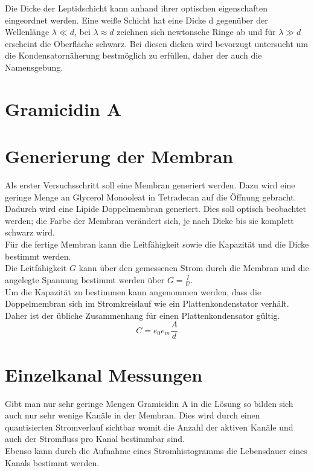 \documentclass{include/thesisclass3}
\begin{document}
Die Dicke der Leptidschicht kann anhand ihrer optischen eigenschaften eingeordnet werden. Eine weiße Schicht hat eine Dicke d gegenüber der Wellenlänge $\lambda \ll d$, bei $\lambda \approx d$ zeichnen sich newtonsche Ringe ab und für $\lambda \gg d$ erscheint die Oberfläche schwarz. Bei diesen dicken wird bevorzugt untersucht um die Kondensatornäherung bestmöglich zu erfüllen, daher der auch die Namensgebung.

\section{Gramicidin A}



\section{Generierung der Membran}
Als erster Versuchsschritt soll eine Membran generiert werden. Dazu wird eine geringe Menge an Glycerol Monooleat in Tetradecan auf die Öffnung gebracht. Dadurch wird eine Lipide Doppelmembran generiert. Dies soll optisch beobachtet werden; die Farbe der Membran verändert sich, je nach Dicke bis sie komplett schwarz wird.\\
Für die fertige Membran kann die Leitfähigkeit sowie die Kapazität und die Dicke bestimmt werden. \\Die Leitfähigkeit $G$ kann über den gemessenen Strom durch die Membran und die angelegte Spannung bestimmt werden über $G = \frac{I}{U}$. \\Um die Kapazität zu bestimmen kann angenommen werden, dass die Doppelmembran  sich im Stromkreislauf wie ein Plattenkondenstator verhält. Daher ist der übliche Zusammenhang für einen Plattenkondensator gültig.
\begin{equation}
C = e_0e_m \frac{A}{d}
\end{equation}



\section{Einzelkanal Messungen}
Gibt man nur sehr geringe Mengen Gramicidin A in die Lösung so bilden sich auch nur sehr wenige Kanäle in der Membran. Dies wird durch einen quantisierten Stromverlauf sichtbar womit die Anzahl der aktiven Kanäle und auch der Stromfluss pro Kanal bestimmbar sind.\\
Ebenso kann durch die Aufnahme eines Stromhistogramms die Lebensdauer eines Kanals bestimmt werden.
\end{document}
